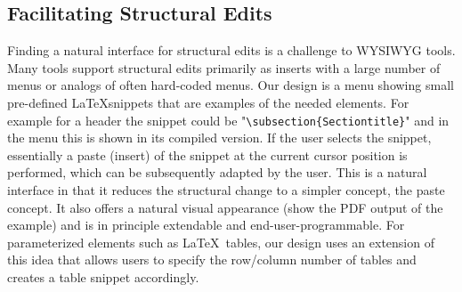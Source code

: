 \documentclass[sigconf]{acmart}
\begin{document}
\subsection{Facilitating Structural Edits}
Finding a natural interface for structural edits is a challenge to WYSIWYG tools. 
Many tools support structural edits primarily as inserts with a large number of menus or analogs of often hard-coded menus. 
Our design is a menu showing small pre-defined \LaTeX snippets that are examples of the needed elements. For example for a header the snippet could be "{\small \verb$\subsection{Sectiontitle}$}"  and in the menu this is shown in its compiled version. If the user selects the snippet, essentially a paste (insert) of the snippet at the current cursor position is performed, which can be subsequently adapted by the user. This is a natural interface in that it reduces the structural change to a simpler concept, the paste concept. It also offers a natural visual appearance (show the PDF output of the example) and is in principle extendable and end-user-programmable.
For parameterized elements such as \LaTeX\ tables, our design uses an extension of this idea that allows users to specify the row/column number of tables and creates a table snippet accordingly.

\end{document}
